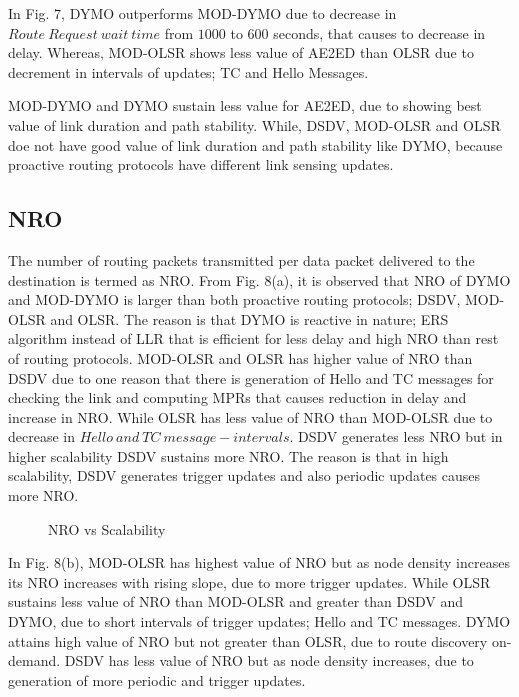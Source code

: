 \documentclass[journal]{IEEEtran}
\begin{document}
In Fig. 7, DYMO outperforms MOD-DYMO due to decrease in $Route~Request~wait~time$ from $1000$ to $600$ seconds, that causes to decrease in delay. Whereas, MOD-OLSR shows less value of AE2ED than OLSR due to decrement in intervals of updates; TC and Hello Messages.

MOD-DYMO and DYMO sustain less value for AE2ED, due to showing best value of link duration and path stability. While, DSDV, MOD-OLSR and OLSR doe not have good value of link duration and path stability like DYMO, because proactive routing protocols have different link sensing updates.

\subsection{NRO}
The number of routing packets transmitted per data packet delivered to the destination is termed as NRO. From Fig. 8(a), it is observed that NRO of DYMO and MOD-DYMO is larger than both proactive routing protocols; DSDV, MOD-OLSR and OLSR. The reason is that DYMO is reactive in nature; ERS algorithm instead of LLR that is efficient for less delay and high NRO than rest of routing protocols. MOD-OLSR and OLSR has higher value of NRO than DSDV due to one reason that there is generation of Hello and TC messages for checking the link and computing MPRs that causes reduction in delay and increase in NRO. While OLSR has less value of NRO than MOD-OLSR due to decrease in $Hello~and~TC~message-intervals$. DSDV generates less NRO but in higher scalability DSDV sustains more NRO. The reason is that in high scalability, DSDV generates trigger updates and also periodic updates causes more NRO.

\begin{figure}[h]
  \centering
 \caption{NRO vs Scalability}
\end{figure}

In Fig. 8(b), MOD-OLSR has highest value of NRO but as node density increases its NRO increases with rising slope, due to more trigger updates. While OLSR sustains less value of NRO than MOD-OLSR and greater than DSDV and DYMO, due to short intervals of trigger updates; Hello and TC messages. DYMO attains high value of NRO but not greater than OLSR, due to route discovery on-demand. DSDV has less value of NRO but as node density increases, due to generation of more periodic and trigger updates.
\end{document}
